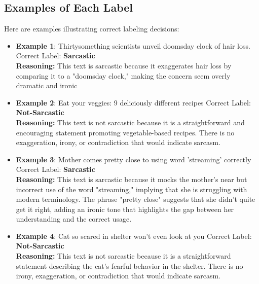 \documentclass[12pt]{article}
\begin{document}
\subsection{Examples of Each Label}
Here are examples illustrating correct labeling decisions:

\begin{itemize}
    \item \textbf{Example 1}: Thirtysomething scientists unveil doomsday clock of hair loss. \newline
    Correct Label: \textbf{Sarcastic} \\
    \textbf{Reasoning:} This text is sarcastic because it exaggerates hair loss by comparing it to a "doomsday clock," making the concern seem overly dramatic and ironic

    \item \textbf{Example 2}: Eat your veggies: 9 deliciously different recipes \newline
    Correct Label: \textbf{Not-Sarcastic} \\
    \textbf{Reasoning:} This text is not sarcastic because it is a straightforward and encouraging statement promoting vegetable-based recipes. There is no exaggeration, irony, or contradiction that would indicate sarcasm.

    \item \textbf{Example 3}: Mother comes pretty close to using word 'streaming' correctly \newline
    Correct Label: \textbf{Sarcastic} \\
    \textbf{Reasoning:} This text is sarcastic because it mocks the mother's near but incorrect use of the word "streaming," implying that she is struggling with modern terminology. The phrase "pretty close" suggests that she didn't quite get it right, adding an ironic tone that highlights the gap between her understanding and the correct usage.

    \item \textbf{Example 4}: Cat so scared in shelter won't even look at you \newline
    Correct Label: \textbf{Not-Sarcastic} \\
    \textbf{Reasoning:} This text is not sarcastic because it is a straightforward statement describing the cat’s fearful behavior in the shelter. There is no irony, exaggeration, or contradiction that would indicate sarcasm.

\end{itemize}
\end{document}
